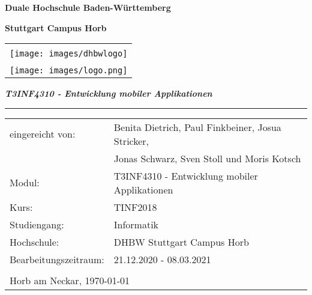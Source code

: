 \titlepage
\begin{center}
    \textbf{\large{}Duale Hochschule Baden-Württemberg }{\large\par}
    \par
\end{center}
\begin{center}
    \textbf{\large{}Stuttgart Campus Horb}{\large\par}
    \par
\end{center}
\begin{center}
    \begin{tabular}{l||r}
        \multicolumn{2}{c}{\vspace{1cm}}
        \tabularnewline
        \multicolumn{2}{c}{\texttt{[image: images/dhbwlogo]}}
        \tabularnewline
        \multicolumn{2}{c}{}
        \tabularnewline
        \multicolumn{2}{c}{\texttt{[image: images/logo.png]}}
        \tabularnewline
    \end{tabular}
    \par
\end{center}
\vspace{0.5cm}

\begin{flushleft}
    \textbf{\Large{}\title{}}{\Large\par}
    \par
\end{flushleft}

\begin{flushleft}
    \textbf{\textit{T3INF4310 - Entwicklung mobiler Applikationen}}
    \par
\end{flushleft}

\begin{flushleft}
    {\Large{}\rule[0.5ex]{1\columnwidth}{1pt}}{\Large\par}
    \par
\end{flushleft}

\begin{tabular}{ll}
    eingereicht von:\hspace{1cm} & Benita Dietrich, Paul Finkbeiner, Josua Stricker,
    \tabularnewline
    & Jonas Schwarz, Sven Stoll und Moris Kotsch
    \tabularnewline
    Modul: & T3INF4310 - Entwicklung mobiler Applikationen
    \tabularnewline
    Kurs: & TINF2018
    \tabularnewline
    Studiengang: & Informatik
    \tabularnewline
    Hochschule: & DHBW Stuttgart Campus Horb
    \tabularnewline
    Bearbeitungszeitraum: & 21.12.2020 - 08.03.2021
    \tabularnewline
    \tabularnewline
    \multicolumn{2}{l}{Horb am Neckar, \today}
    \tabularnewline
\end{tabular}

\begin{flushleft}
    \newpage{}
    \par
\end{flushleft}